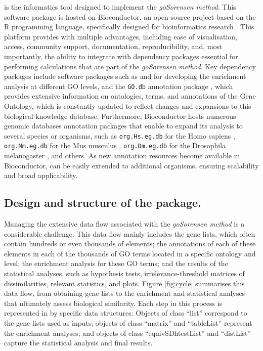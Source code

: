  is the informatics tool designed to implement the \emph{goSorensen method}. This software package is hosted on Bioconductor, an open-source project based on the R programming language, specifically designed for bioinformatics research \citep{gentleman2004bioconductor}. This platform provides  with multiple advantages, including ease of visualisation, access, community support, documentation, reproducibility, and, most importantly, the ability to integrate with dependency packages essential for performing calculations that are part of the \emph{goSorensen method}. Key dependency packages include software packages such as  \citep{clusterProfiler1, clusterProfiler2} and  \citep{goProfiles} for developing the enrichment analysis at different GO levels, and the \texttt{GO.db} annotation package \citep{GOPackage}, which provides extensive information on ontologies, terms, and annotations of the Gene Ontology, which is constantly updated to reflect changes and expansions to this biological knowledge database. Furthermore, Bioconductor hosts numerous genomic databases annotation packages that enable  to expand its analysis to several species or organisms, such as \texttt{org.Hs.eg.db} for the Homo sapiens \citep{humansorg}, \texttt{org.Mm.eg.db} for the Mus musculus \citep{mouseorg}, \texttt{org.Dm.eg.db} for the Drosophila melanogaster \citep{flyorg}, and others. As new annotation resources become available in Bioconductor,  can be easily extended to additional organisms, ensuring scalability and broad applicability.

\subsection{\texorpdfstring{Design and structure of the  package.}{Design and structure of the  package.}}\label{design-and-structure-of-the-package.}

Managing the extensive data flow associated with the \emph{goSorensen method} is a considerable challenge. This data flow mainly includes the gene lists, which often contain hundreds or even thousands of elements; the annotations of each of these elements in each of the thousands of GO terms located in a specific ontology and level; the enrichment analysis for these GO terms; and the results of the statistical analyses, such as hypothesis tests, irrelevance-threshold matrices of dissimilarities, relevant statistics, and plots.
Figure \ref{fig:cycle} summarises this data flow, from obtaining gene lists to the enrichment and statistical analyses that ultimately assess biological similarity. Each step in this process is represented in  by specific data structures: Objects of class ``list'' correspond to the gene lists used as inputs; objects of class ``matrix'' and ``tableList'' represent the enrichment analyses; and objects of class ``equivSDhtestList'' and ``distList'' capture the statistical analysis and final results.

